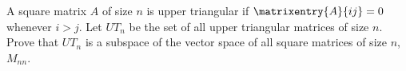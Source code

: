 A square matrix $A$ of size $n$ is upper triangular if $\matrixentry{A}{ij}=0$ whenever $i>j$.  Let $UT_n$ be the set of all upper triangular matrices of size $n$.  Prove that $UT_n$ is a subspace of the vector space of all square matrices of size $n$, $M_{nn}$.
